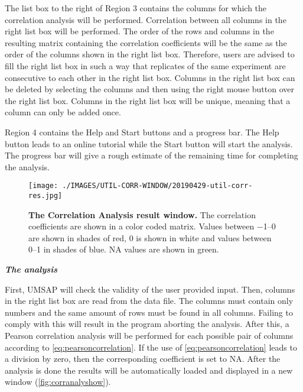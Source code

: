 The list box to the right of Region \num{3} contains the columns for which the correlation analysis will be performed. Correlation between all columns in the right list box will be performed. The  order of the rows and columns in the resulting matrix containing the correlation coefficients will be the same as the order of the columns shown in the right list box. Therefore, users are advised to fill the right list box in such a way that replicates of the same experiment are consecutive to each other in the right list box. Columns in the right list box can be deleted by selecting the columns and then using the right mouse button over the right list box. Columns in the right list box will be unique, meaning that a column can only be added once. 

Region \num{4} contains the Help and Start buttons and a progress bar. The Help button leads to an online tutorial while the Start button will start the analysis. The progress bar will give a rough estimate of the remaining time for completing the analysis.

\begin{figure}[h]
	\centering
	\texttt{[image: ./IMAGES/UTIL-CORR-WINDOW/20190429-util-corr-res.jpg]}	    
	\caption[The Correlation Analysis result window]{\textbf{The Correlation Analysis result window.} The correlation coefficients are shown in a color coded matrix. Values between \numrange{-1}{0} are shown in shades of red, \num{0} is shown in white and values between \numrange{0}{1} in shades of blue. NA values are shown in green.}
	\label{fig:corranalyshow}
	\vspace{-5pt} 	
\end{figure} 

\textit{\textbf{The analysis}}

First, UMSAP will check the validity of the user provided input. Then, columns in the right list box are read from the data file. The columns must contain only numbers and the same amount of rows must be found in all columns. Failing to comply with this will result in the program aborting the analysis. After this, a Pearson correlation \cite{Pearson1895} analysis will be performed for each possible pair of columns according to \autoref{eq:pearsoncorrelation}. If the use of \autoref{eq:pearsoncorrelation} leads to a division by zero, then the corresponding coefficient is set to NA. After the analysis is done the results will be automatically loaded and displayed in a new window (\autoref{fig:corranalyshow}). 

